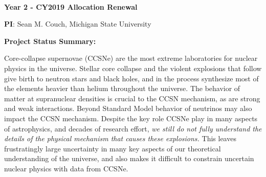 \documentclass[12pt,letterpaper]{article}
\begin{document}
\setlength{\parindent}{0in}

\pagestyle{fancy}
\renewcommand{\headrulewidth}{0.0pt}

\begin{center} \textbf{\doctitle{}} \\
{\bf Year 2 - CY2019 Allocation Renewal } \vspace{-0.1in}

\end{center}

\begin{flushleft}
\textbf{PI}:
Sean M. Couch, Michigan State University \\
\medskip

\textbf{Project Status Summary:}

{\parindent 16pt

Core-collapse supernovae (CCSNe) are the most extreme laboratories for nuclear physics in the universe.
Stellar core collapse and the violent explosions that follow give birth to neutron stars and black holes, and in the process synthesize most of the elements heavier than helium throughout the universe.
The behavior of matter at supranuclear densities is crucial to the CCSN mechanism, as are strong and weak interactions.
Beyond Standard Model behavior of neutrinos may also impact the CCSN mechanism.
Despite the key role CCSNe play in many aspects of astrophysics, and decades of research effort, {\it we still do not fully understand the details of the physical mechanism that causes these explosions.}
This leaves frustratingly large uncertainty in many key aspects of our theoretical understanding of the universe, and also makes it difficult to constrain uncertain nuclear physics with data from CCSNe.

}
\end{flushleft}
\end{document}
